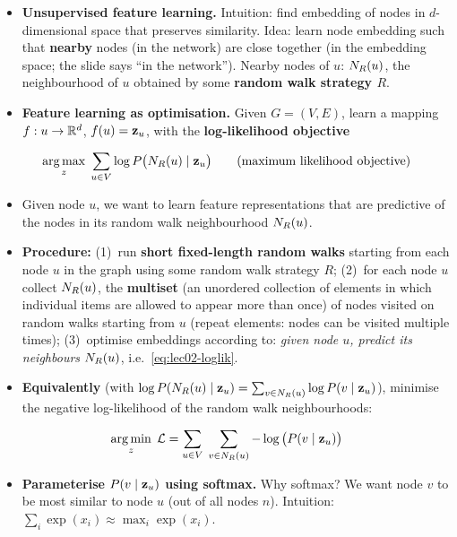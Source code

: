 \begin{itemize}
  \item \textbf{Unsupervised feature learning.} Intuition: find embedding of nodes
    in $d$-dimensional space that preserves similarity. Idea: learn node
    embedding such that \textbf{nearby} nodes (in the network) are close together
    (in the embedding space; the slide says ``in the network''). Nearby nodes of
    $u$: $N_R(u)$, the neighbourhood of $u$ obtained by some \textbf{random walk
    strategy $R$}.
  \item \textbf{Feature learning as optimisation.} Given $G=(V,E)$, learn a
    mapping $f:u\to\mathbb{R}^d$, $f(u)=\mathbf{z}_u$, with the \textbf{log-likelihood
    objective}
\end{itemize}
\begin{equation}\label{eq:lec02-loglik}
  \operatorname*{arg\,max}_{z}\;\sum_{u\in V}\log P\big(N_R(u)\mid\mathbf{z}_u\big)
  \qquad\text{(maximum likelihood objective)}
\end{equation}
\begin{itemize}
  \item Given node $u$, we want to learn feature representations that are
    predictive of the nodes in its random walk neighbourhood $N_R(u)$.
  \item \textbf{Procedure:}
    (1)~run \textbf{short fixed-length random walks} starting from each node $u$
    in the graph using some random walk strategy $R$;
    (2)~for each node $u$ collect $N_R(u)$, the \textbf{multiset} (an unordered collection of elements in which individual items are allowed to appear more than once) of nodes visited
    on random walks starting from $u$ (repeat elements: nodes can be visited
    multiple times);
    (3)~optimise embeddings according to: \emph{given node $u$, predict its
    neighbours $N_R(u)$}, i.e.\ \cref{eq:lec02-loglik}.
  \item \textbf{Equivalently} (with $\log P(N_R(u)\mid\mathbf{z}_u)=\sum_{v\in N_R(u)}\log
    P(v\mid\mathbf{z}_u)$), minimise the negative log-likelihood of the random walk
    neighbourhoods:
\end{itemize}
\begin{equation}\label{eq:lec02-nll}
  \operatorname*{arg\,min}_{z}\;\mathcal{L}=\sum_{u\in V}\;\sum_{v\in N_R(u)}-\log\big(P(v\mid\mathbf{z}_u)\big)
\end{equation}
\begin{itemize}
  \item \textbf{Parameterise $P(v\mid\mathbf{z}_u)$ using softmax.} Why softmax? We want
    node $v$ to be most similar to node $u$ (out of all nodes $n$). Intuition:
    $\sum_i\exp(x_i)\approx\max_i\exp(x_i)$.
\end{itemize}
